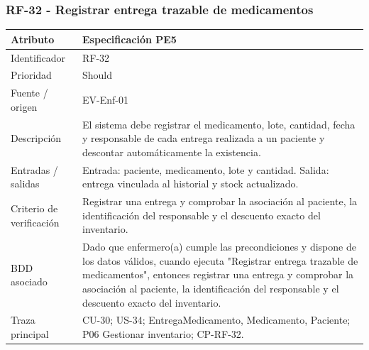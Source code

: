 \documentclass[11pt,a4paper]{article}
\begin{document}
\subsubsection{RF-32 - Registrar entrega trazable de medicamentos}
	\begin{tabularx}{\textwidth}{p{3.2cm}Y}
		\toprule
		\textbf{Atributo} & \textbf{Especificación PE5}\\\midrule
		Identificador & RF-32\\
		Prioridad & Should\\
		Fuente / origen & EV-Enf-01\\
		Descripción & El sistema debe registrar el medicamento, lote, cantidad, fecha y responsable de cada entrega realizada a un paciente y descontar automáticamente la existencia.\\
		Entradas / salidas & Entrada: paciente, medicamento, lote y cantidad. Salida: entrega vinculada al historial y stock actualizado.\\
		Criterio de verificación & Registrar una entrega y comprobar la asociación al paciente, la identificación del responsable y el descuento exacto del inventario.\\
		BDD asociado & Dado que enfermero(a) cumple las precondiciones y dispone de los datos válidos, cuando ejecuta "Registrar entrega trazable de medicamentos", entonces registrar una entrega y comprobar la asociación al paciente, la identificación del responsable y el descuento exacto del inventario.\\
		Traza principal & CU-30; US-34; EntregaMedicamento, Medicamento, Paciente; P06 Gestionar inventario; CP-RF-32.\\
		\bottomrule
	\end{tabularx}
	\clearpage
\end{document}
